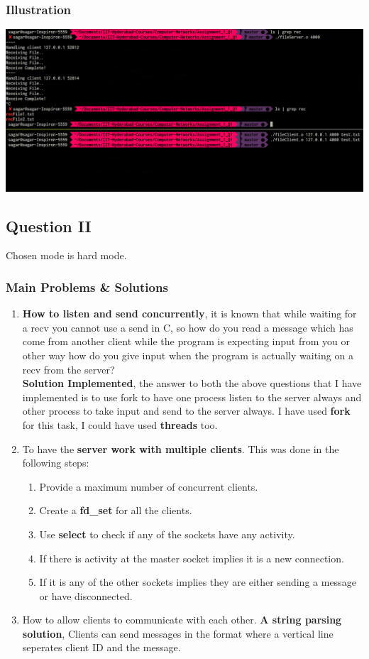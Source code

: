 \documentclass[a4paper,12pt]{report}
\begin{document}
\subsubsection{Illustration}
\begin{center}
\includegraphics[scale=0.25]{a1q1f2.png}
\end{center}
\subsection{Question II}
Chosen mode is hard mode.
\subsubsection{Main Problems \& Solutions}
\begin{enumerate}
\item \textbf{How to listen and send concurrently}, it is known that while waiting for a recv you cannot use a send in C, so how do you read a message which has come from another client while the program is expecting input from you or other way how do you give input when the program is actually waiting on a recv from the server?\\
\textbf{Solution Implemented}, the answer to both the above questions that I have implemented is to use fork to have one process listen to the server always and other process to take input and send to the server always. I have used \textbf{fork} for this task, I could have used \textbf{threads} too.
\item To have the \textbf{server work with multiple clients}. This was done in the following steps:
\begin{enumerate}
\item Provide a maximum number of concurrent clients.
\item Create a \textbf{fd\_set} for all the clients.
\item Use \textbf{select} to check if any of the sockets have any activity.
\item If there is activity at the master socket implies it is a new connection.
\item If it is any of the other sockets implies they are either sending a message or have disconnected.
\end{enumerate}
\item How to allow clients to communicate with each other. \textbf{A string parsing solution}, Clients can send messages in the format where a vertical line seperates client ID and the message.
\end{enumerate}
\end{document}

